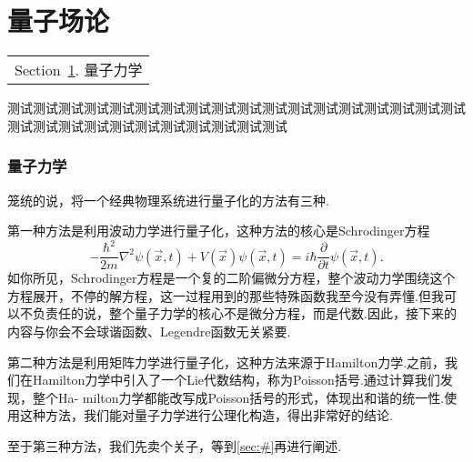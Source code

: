 \part{量子场论}\label{Part:QFT}
	\begin{margintable}\vspace{1.4in}\footnotesize
		\begin{tabularx}{\marginparwidth}{|X}
		Section~\ref{sec:QM}. 量子力学\\
		\end{tabularx}
	\end{margintable}
	测试测试测试测试测试测试测试测试测试测试测试测试测试测试测试测试测试测试测试测试测试测试测试测试测试测试测试测试测试
	\section{量子力学}\label{sec:QM}
		
		笼统的说，将一个经典物理系统进行量子化的方法有三种.
		
		第一种方法是利用波动力学进行量子化，这种方法的核心是Schrodinger方程
		\begin{equation}
			-\frac{\hbar^2}{2m}\nabla^2\psi(\overrightarrow{x},t)+V(\overrightarrow{x})\psi(\overrightarrow{x},t)=i\hbar\frac{\partial}{\partial t}\psi(\overrightarrow{x},t).
		\end{equation}
		如你所见，Schrodinger方程是一个复的二阶偏微分方程，整个波动力学围绕这个方程展开，不停的解方程，这一过程用到的那些特殊函数我至今没有弄懂.但我可以不负责任的说，整个量子力学的核心不是微分方程，而是代数.因此，接下来的内容与你会不会球谐函数、Legendre函数无关紧要.

		第二种方法是利用矩阵力学进行量子化，这种方法来源于Hamilton力学.之前，我们在Hamilton力学中引入了一个Lie代数结构，称为Poisson括号.通过计算我们发现，整个Ha-
		milton力学都能改写成Poisson括号的形式，体现出和谐的统一性.使用这种方法，我们能对量子力学进行公理化构造，得出非常好的结论.

		至于第三种方法，我们先卖个关子，等到\ref{sec:#}再进行阐述.

